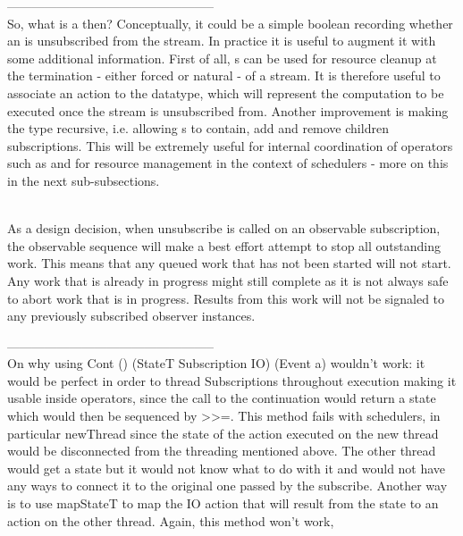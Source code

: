 --------------------------------------------------\\
So, what is a  then? Conceptually, it could be a simple boolean recording whether an  is unsubscribed from the stream. In practice it is useful to augment it with some additional information. First of all, s can be used for resource cleanup at the termination - either forced or natural - of a stream. It is therefore useful to associate an  action to the datatype, which will represent the computation to be executed once the stream is unsubscribed from. Another improvement is making the type recursive, i.e. allowing s to contain, add and remove children subscriptions. This will be extremely useful for internal coordination of operators such as \code{(>>=)} and for resource management in the context of schedulers - more on this in the next sub-subsections.



\\


As a design decision, when unsubscribe is called on an observable subscription, the observable sequence will make a best effort attempt to stop all outstanding work. This means that any queued work that has not been started will not start. Any work that is already in progress might still complete as it is not always safe to abort work that is in progress. Results from this work will not be signaled to any previously subscribed observer instances.


--------------------------------------------------\\
On why using Cont () (StateT Subscription IO) (Event a) wouldn't work: it would be perfect in order to thread Subscriptions throughout execution making it usable inside operators, since the call to the continuation would return a state which would then be sequenced by >>=. This method fails with schedulers, in particular newThread since the state of the action executed on the new thread would be disconnected from the threading mentioned above. The other thread would get a state but it would not know what to do with it and would not have any ways to connect it to the original one passed by the subscribe. Another way is to use mapStateT to map the IO action that will result from the state to an action on the other thread. Again, this method won't work, 


